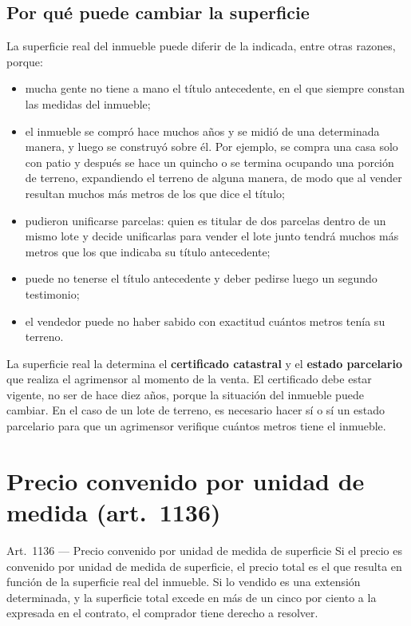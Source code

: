 \documentclass[12pt,oneside]{book}
\begin{document}
\subsection{Por qu\'e puede cambiar la superficie}

La superficie real del inmueble puede diferir de la indicada, entre otras razones, porque:

\begin{itemize}
    \item mucha gente no tiene a mano el t\'itulo antecedente, en el que siempre constan las medidas del inmueble;
    \item el inmueble se compr\'o hace muchos a\~nos y se midi\'o de una determinada manera, y luego se construy\'o sobre \'el. Por ejemplo, se compra una casa solo con patio y despu\'es se hace un quincho o se termina ocupando una porci\'on de terreno, expandiendo el terreno de alguna manera, de modo que al vender resultan muchos m\'as metros de los que dice el t\'itulo;
    \item pudieron unificarse parcelas: quien es titular de dos parcelas dentro de un mismo lote y decide unificarlas para vender el lote junto tendr\'a muchos m\'as metros que los que indicaba su t\'itulo antecedente;
    \item puede no tenerse el t\'itulo antecedente y deber pedirse luego un segundo testimonio;
    \item el vendedor puede no haber sabido con exactitud cu\'antos metros ten\'ia su terreno.
\end{itemize}

La superficie real la determina el \textbf{certificado catastral} y el \textbf{estado parcelario} que realiza el agrimensor al momento de la venta. El certificado debe estar vigente, no ser de hace diez a\~nos, porque la situaci\'on del inmueble puede cambiar. En el caso de un lote de terreno, es necesario hacer s\'i o s\'i un estado parcelario para que un agrimensor verifique cu\'antos metros tiene el inmueble.

\section{Precio convenido por unidad de medida (art.~1136)}

\begin{norma}{Art.~1136 --- Precio convenido por unidad de medida de superficie}
Si el precio es convenido por unidad de medida de superficie, el precio total es el que resulta en funci\'on de la superficie real del inmueble. Si lo vendido es una extensi\'on determinada, y la superficie total excede en m\'as de un cinco por ciento a la expresada en el contrato, el comprador tiene derecho a resolver.
\end{norma}
\end{document}
